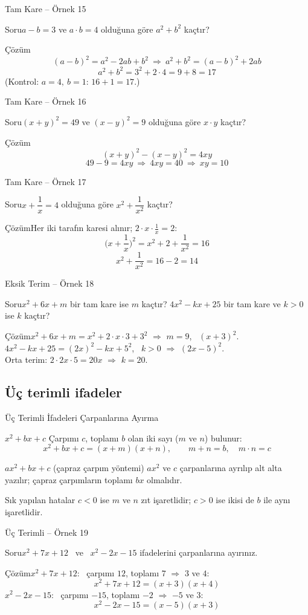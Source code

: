 \documentclass[aspectratio=169,11pt]{beamer}
\newcommand{\soru}[3]{%
\begin{frame}{#1}
  \begin{block}{Soru}\large #2\end{block}
  \pause
  \begin{exampleblock}{Çözüm}\large #3\end{exampleblock}
\end{frame}}
\begin{document}
\soru{Tam Kare -- Örnek 15}
{\(a-b=3\) ve \(a\cdot b=4\) olduğuna göre \(a^2+b^2\) kaçtır?}
{\[(a-b)^2=a^2-2ab+b^2\ \Rightarrow\ a^2+b^2=(a-b)^2+2ab\]
\[a^2+b^2=3^2+2\cdot 4=9+8=17\]
(Kontrol: \(a=4,\ b=1\): \(16+1=17\).)}

\soru{Tam Kare -- Örnek 16}
{\((x+y)^2=49\) ve \((x-y)^2=9\) olduğuna göre \(x\cdot y\) kaçtır?}
{\[(x+y)^2-(x-y)^2=4xy\]
\[49-9=4xy\ \Rightarrow\ 4xy=40\ \Rightarrow\ xy=10\]}

\soru{Tam Kare -- Örnek 17}
{\(x+\dfrac{1}{x}=4\) olduğuna göre \(x^2+\dfrac{1}{x^2}\) kaçtır?}
{Her iki tarafın karesi alınır; \(2\cdot x\cdot\frac{1}{x}=2\):
\[\Big(x+\frac{1}{x}\Big)^2=x^2+2+\frac{1}{x^2}=16\]
\[x^2+\frac{1}{x^2}=16-2=14\]}

\soru{Eksik Terim -- Örnek 18}
{\(x^2+6x+m\) bir tam kare ise \(m\) kaçtır? \(4x^2-kx+25\) bir tam kare ve \(k>0\) ise \(k\) kaçtır?}
{\(x^2+6x+m=x^2+2\cdot x\cdot 3+3^2\) \(\Rightarrow\) \(m=9\), \ \((x+3)^2\).\\[4pt]
\(4x^2-kx+25=(2x)^2-kx+5^2\), \ \(k>0\) \(\Rightarrow\) \((2x-5)^2\).\\[3pt]
Orta terim: \(2\cdot 2x\cdot 5=20x\) \(\Rightarrow\) \(k=20\).}

\subsection{Üç terimli ifadeler}
\begin{frame}{Üç Terimli İfadeleri Çarpanlarına Ayırma}
\begin{block}{\(x^2+bx+c\)}
Çarpımı \(c\), toplamı \(b\) olan iki sayı (\(m\) ve \(n\)) bulunur:
\[x^2+bx+c=(x+m)(x+n),\qquad m+n=b,\quad m\cdot n=c\]
\end{block}
\begin{block}{\(ax^2+bx+c\) (çapraz çarpım yöntemi)}
\(ax^2\) ve \(c\) çarpanlarına ayrılıp alt alta yazılır; çapraz çarpımların toplamı \(bx\) olmalıdır.
\end{block}
\begin{alertblock}{Sık yapılan hatalar}
\(c<0\) ise \(m\) ve \(n\) zıt işaretlidir; \(c>0\) ise ikisi de \(b\) ile aynı işaretlidir.
\end{alertblock}
\end{frame}

\soru{Üç Terimli -- Örnek 19}
{\(x^2+7x+12\) \ ve \ \(x^2-2x-15\) ifadelerini çarpanlarına ayırınız.}
{\(x^2+7x+12\): \ çarpımı \(12\), toplamı \(7\) \(\Rightarrow\) \(3\) ve \(4\):
\[x^2+7x+12=(x+3)(x+4)\]
\(x^2-2x-15\): \ çarpımı \(-15\), toplamı \(-2\) \(\Rightarrow\) \(-5\) ve \(3\):
\[x^2-2x-15=(x-5)(x+3)\]}
\end{document}
